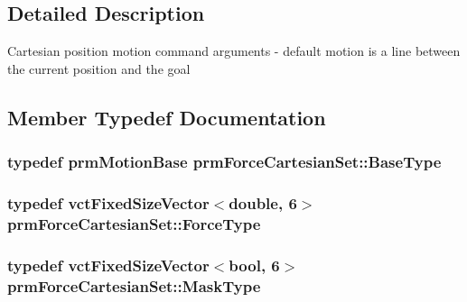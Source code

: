 \subsection{Detailed Description}
Cartesian position motion command arguments -\/ default motion is a line between the current position and the goal 

\subsection{Member Typedef Documentation}
\hypertarget{classprm_force_cartesian_set_a1b8582b968aaf818d1305d80d2f7f5df}{
\subsubsection[{Base\-Type}]{\setlength{\rightskip}{0pt plus 5cm}typedef {\bf prm\-Motion\-Base} {\bf prm\-Force\-Cartesian\-Set\-::\-Base\-Type}}}\label{classprm_force_cartesian_set_a1b8582b968aaf818d1305d80d2f7f5df}
\hypertarget{classprm_force_cartesian_set_aef7a9a5a3ce601f7d1f1c752ddb36c00}{
\subsubsection[{Force\-Type}]{\setlength{\rightskip}{0pt plus 5cm}typedef {\bf vct\-Fixed\-Size\-Vector}$<$double, 6$>$ {\bf prm\-Force\-Cartesian\-Set\-::\-Force\-Type}}}\label{classprm_force_cartesian_set_aef7a9a5a3ce601f7d1f1c752ddb36c00}
\hypertarget{classprm_force_cartesian_set_abcc1516523be27cf3b572d0d1c463db9}{
\subsubsection[{Mask\-Type}]{\setlength{\rightskip}{0pt plus 5cm}typedef {\bf vct\-Fixed\-Size\-Vector}$<$bool, 6$>$ {\bf prm\-Force\-Cartesian\-Set\-::\-Mask\-Type}}}\label{classprm_force_cartesian_set_abcc1516523be27cf3b572d0d1c463db9}


